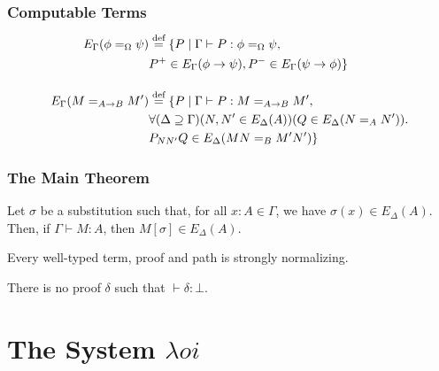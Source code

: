 \documentclass[handout]{beamer}
\newcommand{\eqdef}{\mathrel{\smash{\stackrel{\text{def}}{=}}}}
\begin{document}
\begin{frame}
\frametitle{Computable Terms}
\begin{align*}
E_\Gamma(\phi =_\Omega \psi) & \eqdef \{ P \mid \Gamma \vdash P : \phi =_\Omega \psi, \\
& P^+ \in E_\Gamma(\phi \rightarrow \psi), P^- \in E_\Gamma(\psi \rightarrow \phi) \} \\
\\
E_\Gamma(M =_{A \rightarrow B} M') & \eqdef \{ P \mid \Gamma \vdash P : M =_{A \rightarrow B} M', \\
& \forall (\Delta \supseteq \Gamma) (N, N' \in E_\Delta(A)) (Q \in E_\Delta(N =_A N')). \\
& P_{NN'}Q \in E_\Delta(MN =_B M'N') \}
\end{align*}
\end{frame}

\begin{frame}
\frametitle{The Main Theorem}

\begin{theorem}
Let $\sigma$ be a substitution such that, for all $x : A \in \Gamma$, we have $\sigma(x) \in E_\Delta(A)$.
Then, if $\Gamma \vdash M : A$, then $M [ \sigma ] \in E_\Delta(A)$.
\end{theorem}

\small{
}

\begin{corollary}
Every well-typed term, proof and path is strongly normalizing.
\end{corollary}

\small{
}

\begin{corollary}[Consistency]
There is no proof $\delta$ such that $\vdash \delta : \bot$.
\end{corollary}
\end{frame}

\section{The System $\lambda o i$}
\end{document}
